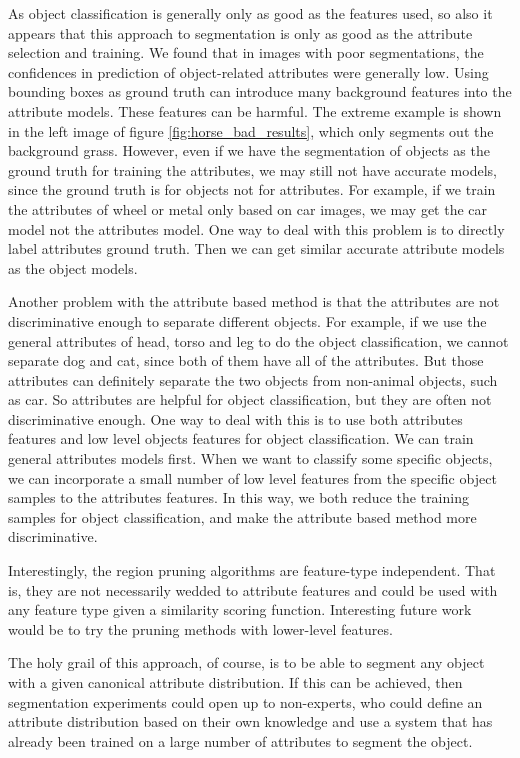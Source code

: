 \documentclass[10pt,twocolumn,letterpaper]{article}
\begin{document}
As object classification is generally only as good as the features used, so also it
appears that this approach to segmentation is only as good as the attribute
selection and training.  We found that in images with poor segmentations, the
confidences in prediction of object-related attributes were generally low. Using bounding 
boxes as ground truth can introduce many background features into the attribute models. These 
features can be harmful. The extreme example is shown in the left image of figure \ref{fig:horse_bad_results}, 
which only segments out the background grass. However, even if we have the segmentation 
of objects as the ground truth for training the attributes, we may still not have accurate 
models, since the ground truth is for objects not for attributes. For example, if we train 
the attributes of wheel or metal only based on car images, we may get the car model not 
the attributes model. One way to deal with this problem is to directly label attributes 
ground truth. Then we can get similar accurate attribute models as the object models. 

Another problem with the attribute based method is that the attributes are not discriminative 
enough to separate different objects. For example, if we use the general attributes of head, torso and leg to 
do the object classification, we cannot separate dog and cat, since both of them have all of the attributes. 
But those attributes can definitely separate the two objects from non-animal objects, such as car. So
attributes are helpful for object classification, but they are often not discriminative enough. One way to deal with this is to use 
both attributes features and low level objects features for object classification. We can train general attributes models first. 
When we want to classify some specific objects, we can incorporate a small number of low level features from the specific object samples to the attributes 
features. In this way, we both reduce the training samples for object classification, and make the attribute based method more discriminative.

Interestingly, the region pruning algorithms are feature-type independent.  That
is, they are not necessarily wedded to attribute features and could be used with
any feature type given a similarity scoring function.  Interesting future work would
be to try the pruning methods with lower-level features.

The holy grail of this approach, of course, is to be able to segment any object
with a given canonical attribute distribution.  If this can be achieved, 
then segmentation experiments
could open up to non-experts, who could define an attribute distribution
based on their own knowledge and use a system that has already been trained
on a large number of attributes to segment the object.
\end{document}
